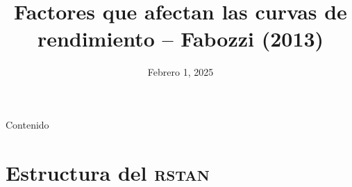 \documentclass{beamer}
\title{Factores que afectan las curvas de rendimiento -- Fabozzi (2013)}
\author[]{}
\institute[]{\large\textbf{Universidad Nacional de Coloombia}}
\date{Febrero 1, 2025}
\begin{document}
\frame{\titlepage}

\begin{frame}{Contenido}
\tableofcontents
\end{frame}

\section{Estructura del \textsc{rstan}}

\begin{frame}

\end{frame}
\begin{frame}

\end{frame}
\end{document}

